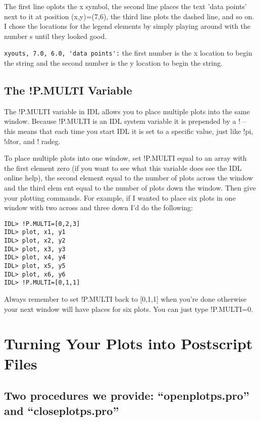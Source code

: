 	The first line oplots the x symbol, the second line places the
text 'data points' next to it at position (x,y)=(7,6), the third line
plots the dashed line, and so on.  I chose the locations for the legend
elements by simply playing around with the number s until they looked
good. 

\verb&xyouts, 7.0, 6.0, 'data points':& the first number is the x
location to begin the string and the second number is the y location to
begin the string. 

\subsection{The !P.MULTI Variable}\label{pmulti}

	The !P.MULTI variable in IDL allows you to place multiple plots
into the same window.  Because !P.MULTI is an IDL system variable it is
prepended by a ! -- this means that each time you start IDL it is set to
a specific value, just like !pi, !dtor, and ! radeg. 

	To place multiple plots into one window, set !P.MULTI equal to
an array with the first element zero (if you want to see what this
variable does see the IDL online help), the second element equal to the
number of plots across the window and the third elem ent equal to the
number of plots down the window.  Then give your plotting commands.  For
example, if I wanted to place six plots in one window with two across
and three down I'd do the following:

\begin{verbatim}
IDL> !P.MULTI=[0,2,3]
IDL> plot, x1, y1
IDL> plot, x2, y2
IDL> plot, x3, y3
IDL> plot, x4, y4
IDL> plot, x5, y5
IDL> plot, x6, y6
IDL> !P.MULTI=[0,1,1]
\end{verbatim}

	Always remember to set !P.MULTI back to [0,1,1] when you're done
otherwise your next window will have places for six plots.  You can just
type !P.MULTI=0.

\section{Turning Your Plots into Postscript Files}\label{psfiles}

\subsection{Two procedures we provide: ``openplotps.pro'' and ``closeplotps.pro''}


